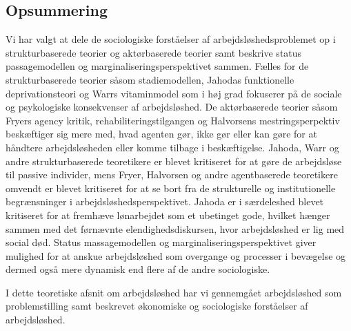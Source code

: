 
\subsection{Opsummering}

Vi har valgt at dele de sociologiske forståelser af arbejdsløshedsproblemet op i strukturbaserede teorier og aktørbaserede teorier samt beskrive status passagemodellen og marginaliseringsperspektivet sammen. Fælles for de strukturbaserede teorier såsom stadiemodellen, Jahodas funktionelle deprivationsteori og Warrs vitaminmodel som i høj grad fokuserer på de sociale og psykologiske konsekvenser af arbejdsløshed. De aktørbaserede teorier såsom Fryers agency kritik, rehabiliteringstilgangen og Halvorsens mestringsperpektiv beskæftiger sig mere med, hvad agenten gør, ikke gør eller kan gøre for at håndtere arbejdsløsheden eller komme tilbage i beskæftigelse. Jahoda, Warr og andre strukturbaserede teoretikere er blevet kritiseret for at gøre de arbejdsløse til passive individer, mens Fryer, Halvorsen og andre agentbaserede teoretikere omvendt er blevet kritiseret for at se bort fra de strukturelle og institutionelle begrænsninger i arbejdsløshedsperspektivet. Jahoda er i særdeleshed blevet kritiseret for at fremhæve lønarbejdet som et ubetinget gode, hvilket hænger sammen med det førnævnte elendighedsdiskursen, hvor arbejdsløshed er lig med social død. Status massagemodellen og marginaliseringsperspektivet giver mulighed for at anskue arbejdsløshed som overgange og processer i bevægelse og dermed også mere dynamisk end flere af de andre sociologiske.

I dette teoretiske afsnit om arbejdsløshed har vi gennemgået arbejdsløshed som problemstilling samt beskrevet økonomiske og sociologiske forståelser af arbejdsløshed.

